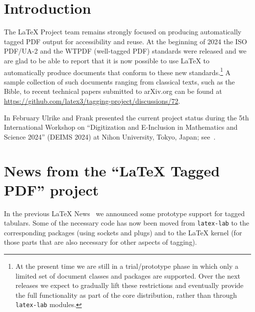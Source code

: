 \documentclass{ltnews}
\providecommand\tubcommand[1]{}
\begin{document}
\tubcommand{\addtolength\textheight{4.2pc}}   %

\maketitle
{  \spaceskip=3.33pt 
\tableofcontents}

\setlength{}

\medskip

\section{Introduction}

The \LaTeX{} Project team remains strongly focused on producing
automatically tagged PDF output for accessibility and reuse. At the
beginning of 2024 the ISO PDF/UA-2 and the WTPDF (well-tagged PDF)
standards were released and we are glad to be able to report that it
is now possible to use \LaTeX{} to automatically produce documents
that conform to these new standards.\footnote{At the present time we
are still in a trial/prototype phase in which only a limited set of
document classes and packages are supported.  Over the next releases
we expect to gradually lift these restrictions and eventually provide
the full functionality as part of the core distribution, rather than
through \texttt{latex-lab} modules.}  A sample collection of such
documents ranging from classical texts, such as the Bible, to recent
technical papers submitted to arXiv.org can be found at
\url{https://github.com/latex3/tagging-project/discussions/72}.

In February Ulrike and Frank presented the current project status
during the 5th International Workshop on \enquote{Digitization and
  E-Inclusion in Mathematics and Science 2024} (DEIMS 2024) at Nihon
University, Tokyo, Japan; see~\cite{39:deims}.


\section{News from the \enquote{\LaTeX{} Tagged PDF} project}

In the previous \LaTeX{} News~\cite{39:ltnews38} we announced some prototype
support for tagged tabulars. Some of the necessary code has
now been moved from \texttt{latex-lab} to the corresponding packages
(using sockets and plugs) and to the \LaTeX{} kernel (for those parts
that are also necessary for other aspects of tagging).
\end{document}
